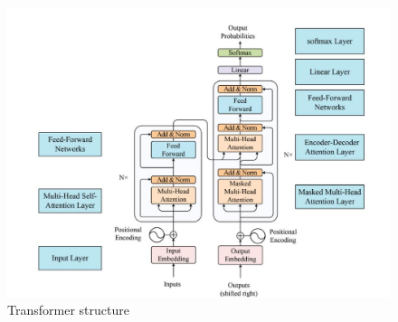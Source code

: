 \begin{figure}
  \centering
  \includegraphics[width=.7\textwidth]{gambar/struktur-transformer.jpg}
  \caption{Transformer structure \cite{vaswani2017attention}}
  \label{fig:transformer}
\end{figure}

